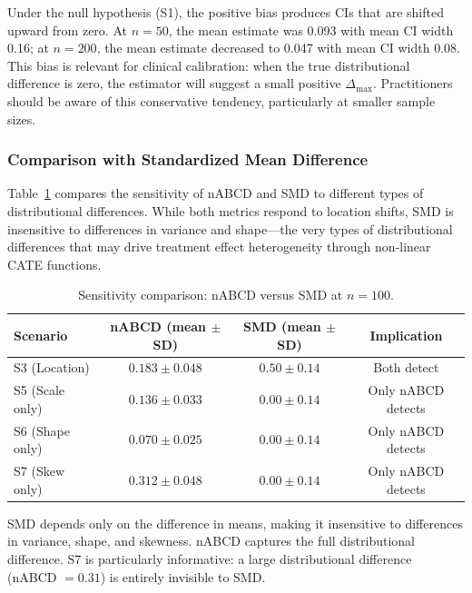 \documentclass[AMA,Times1COL]{WileyNJDv5}
\begin{document}
Under the null hypothesis (S1), the positive bias produces CIs that are shifted upward from zero. At $n = 50$, the mean estimate was 0.093 with mean CI width 0.16; at $n = 200$, the mean estimate decreased to 0.047 with mean CI width 0.08. This bias is relevant for clinical calibration: when the true distributional difference is zero, the estimator will suggest a small positive $\Delta_{\max}$. Practitioners should be aware of this conservative tendency, particularly at smaller sample sizes.

\subsubsection{Comparison with Standardized Mean Difference}

Table~\ref{tab:smd} compares the sensitivity of nABCD and SMD to different types of distributional differences. While both metrics respond to location shifts, SMD is insensitive to differences in variance and shape---the very types of distributional differences that may drive treatment effect heterogeneity through non-linear CATE functions.

\begin{table}[ht]
\caption{Sensitivity comparison: nABCD versus SMD at $n=100$.\label{tab:smd}}
\begin{tabular*}{\textwidth}{@{\extracolsep\fill}lccc@{}}
\toprule
\textbf{Scenario} & \textbf{nABCD (mean $\pm$ SD)} & \textbf{SMD (mean $\pm$ SD)} & \textbf{Implication} \\
\midrule
S3 (Location) & $0.183 \pm 0.048$ & $0.50 \pm 0.14$ & Both detect \\
S5 (Scale only) & $0.136 \pm 0.033$ & $0.00 \pm 0.14$ & Only nABCD detects \\
S6 (Shape only) & $0.070 \pm 0.025$ & $0.00 \pm 0.14$ & Only nABCD detects \\
S7 (Skew only) & $0.312 \pm 0.048$ & $0.00 \pm 0.14$ & Only nABCD detects \\
\bottomrule
\end{tabular*}
\begin{tablenotes}
\item SMD depends only on the difference in means, making it insensitive to differences in variance, shape, and skewness. nABCD captures the full distributional difference. S7 is particularly informative: a large distributional difference (nABCD $= 0.31$) is entirely invisible to SMD.
\end{tablenotes}
\end{table}
\end{document}
